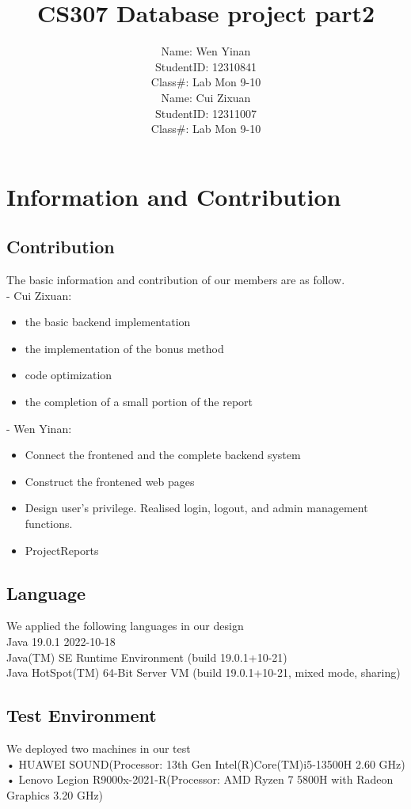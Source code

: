\documentclass{article}
\title{CS307 Database project part2}
\author{Name: Wen Yinan\\
StudentID: 12310841\\
\vspace{1em} %
Class#: Lab Mon 9-10\\
Name: Cui Zixuan\\
StudentID: 12311007\\
Class#: Lab Mon 9-10
}
\begin{document}
\doublespacing
\maketitle
\newpage
\tableofcontents

\newpage
\section{Information and Contribution}
\subsection{Contribution}

The basic information and contribution of our members are as follow.\\
- Cui Zixuan:
\begin{itemize}
    \item the basic backend implementation
    \item the implementation of the bonus method
    \item code optimization
    \item the completion of a small portion of the report
\end{itemize}
- Wen Yinan:
\begin{itemize}
    \item Connect the frontened and the complete backend system
    \item Construct the frontened web pages
    \item Design user's privilege. Realised login, logout, and admin management functions.
    \item ProjectReports
\end{itemize}

\subsection{Language}

We applied the following languages in our design\\
    Java 19.0.1 2022-10-18\\
    Java(TM) SE Runtime Environment (build 19.0.1+10-21)\\
    Java HotSpot(TM) 64-Bit Server VM (build 19.0.1+10-21, mixed mode, sharing)\\

\subsection{Test Environment}
We deployed two machines in our test\\
• HUAWEI SOUND(Processor: 13th Gen Intel(R)Core(TM)i5-13500H 2.60 GHz)\\
 • Lenovo Legion R9000x-2021-R(Processor: AMD Ryzen 7 5800H with Radeon Graphics            3.20 GHz)
\end{document}
